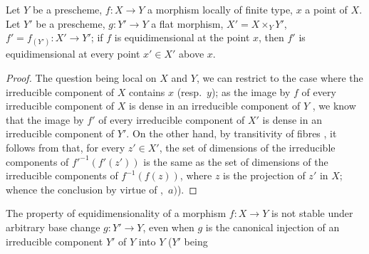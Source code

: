 
\begin{proposition}[13.3.8]
\label{IV.13.3.8}
Let $Y$ be a prescheme, $f:X\to Y$ a morphism locally of finite type, $x$ a point of $X$.
Let $Y'$ be a prescheme, $g:Y'\to Y$ a flat morphism, $X'=X\times_Y Y'$, $f'=f_{(Y')}:X'\to Y'$; if $f$ is equidimensional at the point $x$, then $f'$ is equidimensional at every point $x'\in X'$ above $x$.
\end{proposition}

\begin{proof}
The question being local on $X$ and $Y$, we can restrict to the case where the irreducible component of $X$ contains $x$ (resp.\ $y$); as the image by $f$ of every irreducible component of $X$ is dense in an irreducible component of $Y$ , we know  that the image by $f'$ of every irreducible component of $X'$ is dense in an irreducible component of $Y'$.
On the other hand, by transitivity of fibres , it follows from  that, for every $z'\in X'$, the set of dimensions of the irreducible components of ${f'}^{-1}(f'(z'))$ is the same as the set of dimensions of the irreducible components of $f^{-1}(f(z))$, where $z$ is the projection of $z'$ in $X$; whence the conclusion by virtue of ,~$a)$).
\end{proof}

\begin{remark}[13.3.9]
\label{IV.13.3.9}
The property of equidimensionality of a morphism $f:X\to Y$ is not stable under arbitrary base change $g:Y'\to Y$, even when $g$ is the canonical injection of an irreducible component $Y'$ of $Y$ into $Y$ ($Y'$ being
\end{remark}
